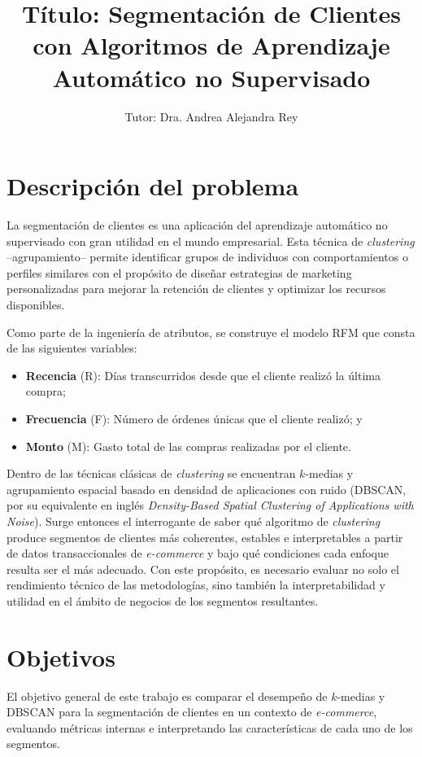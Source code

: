\documentclass[11 pts]{article}
\title{\textbf{Título: Segmentación de Clientes con Algoritmos de Aprendizaje Automático no Supervisado}}
\author{Tutor: Dra. Andrea Alejandra Rey}
\date{}
\begin{document}
\maketitle

\section{Descripción del problema}

La segmentación de clientes es una aplicación del aprendizaje automático no supervisado con gran utilidad en el mundo empresarial. 
Esta técnica de \emph{clustering} --agrupamiento-- permite identificar grupos de individuos con comportamientos o perfiles similares con el propósito de diseñar estrategias de marketing personalizadas para mejorar la retención de clientes y optimizar los recursos disponibles.

Como parte de la ingeniería de atributos, se construye el modelo RFM que consta de las siguientes variables:
\begin{itemize}
\item \textbf{Recencia} (R): Días transcurridos desde que el cliente realizó la última compra;
\item \textbf{Frecuencia} (F): Número de órdenes únicas que el cliente realizó; y
\item \textbf{Monto} (M): Gasto total de las compras realizadas por el cliente.
\end{itemize}


Dentro de las técnicas clásicas de \emph{clustering} se encuentran $k$-medias y agrupamiento espacial basado en densidad de aplicaciones con ruido (DBSCAN, por su equivalente en inglés \emph{Density-Based Spatial Clustering of Applications with Noise}).
Surge entonces el interrogante de saber qué algoritmo de \emph{clustering} produce segmentos de clientes más coherentes, estables e interpretables a partir de datos transaccionales de \emph{e-commerce} y bajo qué condiciones cada enfoque resulta ser el más adecuado.
Con este propósito, es necesario evaluar no solo el rendimiento técnico de las metodologías, sino también la interpretabilidad y utilidad en el ámbito de negocios de los segmentos resultantes.

\section{Objetivos}

El objetivo general de este trabajo es comparar el desempeño de $k$-medias y DBSCAN para la segmentación de clientes en un contexto de \emph{e-commerce}, evaluando métricas internas e interpretando las características de cada uno de los segmentos.
\end{document}
